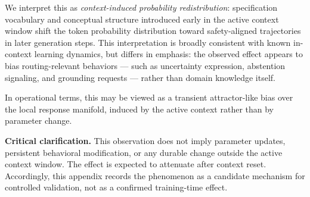 \documentclass[11pt,a4paper]{article}
\begin{document}
We interpret this as \textit{context-induced probability redistribution}: specification
vocabulary and conceptual structure introduced early in the active context window shift
the token probability distribution toward safety-aligned trajectories in later generation
steps. This interpretation is broadly consistent with known in-context learning dynamics,
but differs in emphasis: the observed effect appears to bias routing-relevant
behaviors --- such as uncertainty expression, abstention signaling, and grounding
requests --- rather than domain knowledge itself.

In operational terms, this may be viewed as a transient attractor-like bias over the
local response manifold, induced by the active context rather than by parameter change.

\textbf{Critical clarification.} This observation does not imply parameter updates,
persistent behavioral modification, or any durable change outside the active context
window. The effect is expected to attenuate after context reset. Accordingly, this
appendix records the phenomenon as a candidate mechanism for controlled validation,
not as a confirmed training-time effect.
\end{document}
